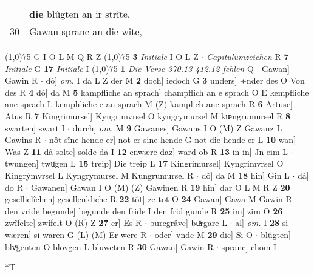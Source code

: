 \documentclass[8pt,a4paper,notitlepage]{article}
\begin{document}
\begin{table}[ht]
\begin{minipage}[t]{0.5\linewidth}
\begin{tabular}{rl}
 & \textbf{die} blûgten an ir strîte.\\ 
30 & Gawan spranc an die wîte,\\ 
\end{tabular}
\scriptsize
\line(1,0){75} \newline
G I O L M Q R Z \newline
\line(1,0){75} \newline
\textbf{3} \textit{Initiale} I O L Z   $\cdot$ \textit{Capitulumzeichen} R  \textbf{7} \textit{Initiale} G  \textbf{17} \textit{Initiale} I  \newline
\line(1,0){75} \newline
\textbf{1} \textit{Die Verse 370.13-412.12 fehlen} Q   $\cdot$ Gawan] Gawin R  $\cdot$ dô] \textit{om.} I da L Z der M \textbf{2} doch] iedoch G \textbf{3} unders] ÷nder des O Von des R \textbf{4} dô] da M \textbf{5} kampflîche an sprach] champflich an e sprach O E kempfliche ane sprach L kemphliche e an sprach M (Z) kamplich ane sprach R \textbf{6} Artuse] Atus R \textbf{7} Kingrimursel] Kyngrimvrsel O kyngrymursel M kᵫngrumursel R \textbf{8} swarten] swart I  $\cdot$ durch] \textit{om.} M \textbf{9} Gawanes] Gawans I O (M) Z Gawanz L Gawins R  $\cdot$ nôt sîne hende er] not er sine hende G not die hende er L \textbf{10} wan] Was Z \textbf{11} dâ solte] solde da I \textbf{12} enwære daz] ward ob R \textbf{13} in in] Jn eim L  $\cdot$ twungen] twuͯgen L \textbf{15} treip] Die treip L \textbf{17} Kingrimursel] Kyngrimvrsel O Kingrýmvrsel L Kyngrymursel M Kungrumursel R  $\cdot$ dô] da M \textbf{18} hin] Gin L  $\cdot$ dâ] do R  $\cdot$ Gawanen] Gawan I O (M) (Z) Gawinen R \textbf{19} hin] dar O L M R Z \textbf{20} geselliclîchen] gesellenkliche R \textbf{22} tôt] ze tot O \textbf{24} Gawan] Gawa M Gawin R  $\cdot$ den vride begunde] begunde den fride I den frid gunde R \textbf{25} im] zim O \textbf{26} zwîfelte] zwifelt O (R) Z \textbf{27} er] Es R  $\cdot$ burcgrâve] buͯrgare L  $\cdot$ al] \textit{om.} I \textbf{28} si wæren] si waren G (L) (M) Er were R  $\cdot$ oder] vnde M \textbf{29} die] Si O  $\cdot$ blûgten] blvͦgenten O blovgen L bluweten R \textbf{30} Gawan] Gawin R  $\cdot$ spranc] chom I \newline
\end{minipage}
\hspace{0.5cm}
\begin{minipage}[t]{0.5\linewidth}
\small
\begin{center}*T
\end{center}
\begin{tabular}{rl}

\end{tabular}
\end{minipage}
\end{table}
\end{document}
